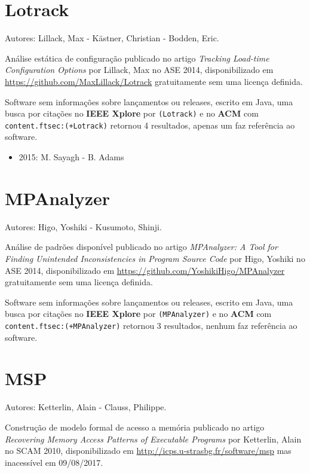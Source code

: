 \section{Lotrack}

Autores:
Lillack, Max - K\"{a}stner, Christian - Bodden, Eric.

Análise estática de configuração
publicado no artigo {\it Tracking Load-time Configuration Options}
por Lillack, Max
no ASE 2014,
disponibilizado em \url{https://github.com/MaxLillack/Lotrack}
gratuitamente
sem uma licença definida.

Software sem informações sobre lançamentos ou releases,
escrito em Java,
uma busca por citações no {\bf IEEE Xplore} por
\texttt{(Lotrack)}
e no {\bf ACM} com
\texttt{content.ftsec:(+Lotrack)}
retornou
4 resultados,
apenas um faz referência ao software.

\begin{itemize}
\item 2015: M. Sayagh - B. Adams
\end{itemize}

\section{MPAnalyzer}

Autores:
Higo, Yoshiki - Kusumoto, Shinji.

Análise de padrões disponível
publicado no artigo {\it MPAnalyzer: A Tool for Finding Unintended Inconsistencies in Program Source Code}
por Higo, Yoshiki
no ASE 2014,
disponibilizado em \url{https://github.com/YoshikiHigo/MPAnalyzer}
gratuitamente
sem uma licença definida.

Software sem informações sobre lançamentos ou releases,
escrito em Java,
uma busca por citações no {\bf IEEE Xplore} por
\texttt{(MPAnalyzer)}
e no {\bf ACM} com
\texttt{content.ftsec:(+MPAnalyzer)}
retornou
3 resultados,
nenhum faz referência ao software.


\section{MSP}

Autores:
Ketterlin, Alain - Clauss, Philippe.

Construção de modelo formal de acesso a memória
publicado no artigo {\it Recovering Memory Access Patterns of Executable Programs}
por Ketterlin, Alain
no SCAM 2010,
disponibilizado em \url{http://icps.u-strasbg.fr/software/msp}
mas inacessível em 09/08/2017.

